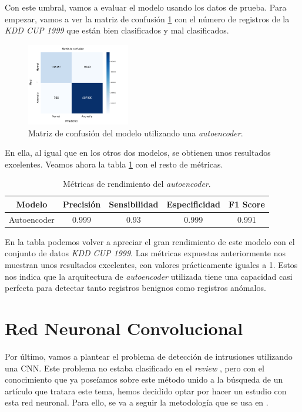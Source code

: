 Con este umbral, vamos a evaluar el modelo usando los datos de prueba. Para empezar, vamos a ver la matriz de confusión \ref{fig: aeKDDConfusion} con el número de registros de la \textit{KDD CUP 1999} que están bien clasificados y mal clasificados.

\begin{figure}[H]
    \centering
    \includegraphics[width=0.4\textwidth]{img/confusionMatrixAE_KDD.png}
    \caption{Matriz de confusión del modelo utilizando una \textit{autoencoder}.}
    \label{fig: aeKDDConfusion}
\end{figure}


En ella, al igual que en los otros dos modelos, se obtienen unos resultados excelentes. Veamos ahora la tabla \ref{tab:kddAE} con el resto de métricas.
\begin{table}[H]
\centering
\begin{tabular}{|c|c|c|c|c|}
\hline
Modelo & Precisión & Sensibilidad & Especificidad & F1 Score \\ \hline
Autoencoder & 0.999 & 0.93 & 0.999 & 0.991 \\ \hline
\end{tabular}
\caption{Métricas de rendimiento del \textit{autoencoder}.}
\label{tab:kddAE}
\end{table}

En la tabla podemos volver a apreciar el gran rendimiento de este modelo con el conjunto de datos \textit{KDD CUP 1999}. Las métricas expuestas anteriormente nos muestran unos resultados excelentes, con valores prácticamente iguales a 1. Estos nos indica que la arquitectura de \textit{autoencoder} utilizada tiene una capacidad casi perfecta para detectar tanto registros benignos como registros anómalos. 






\section{Red Neuronal Convolucional}

Por último, vamos a plantear el problema de detección de intrusiones utilizando una CNN. Este problema no estaba clasificado en el \textit{review} \citep{podder2021artificial}, pero con el conocimiento que ya poseíamos sobre este método unido a la búsqueda de un artículo que tratara este tema, hemos decidido optar por hacer un estudio con esta red neuronal. Para ello, se va a seguir la metodología que se usa en \citep{kim2020cnn, yao2021intrusion}.

